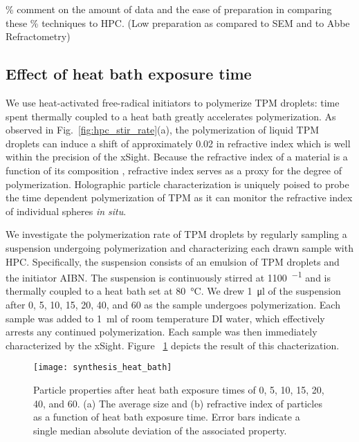 \% comment on the amount of data and the ease of preparation in comparing these
\% techniques to HPC. (Low preparation as compared to SEM and to Abbe Refractometry)

\subsection{Effect of heat bath exposure time}

We use heat-activated free-radical initiators to polymerize TPM droplets:
time spent thermally coupled to a heat bath greatly accelerates polymerization. 
As observed in Fig.~\ref{fig:hpc_stir_rate}(a), the polymerization of
liquid TPM droplets can induce a shift of approximately \SI{0.02}{} in refractive index
which is well within the precision of the xSight.  Because the refractive index
of a material is a function of its composition \cite{wang15},
refractive index serves as a proxy for the degree of polymerization.
Holographic particle characterization is uniquely poised to probe the time dependent
polymerization of TPM as it can monitor the refractive index of individual spheres
\emph{in situ}.

We investigate the polymerization rate of TPM droplets by regularly sampling a
suspension undergoing polymerization and characterizing each drawn sample with HPC.
Specifically, the suspension consists of an emulsion of TPM droplets
and the initiator AIBN. The suspension is continuously stirred at \SI{1100}{\min^{-1}}
and is thermally coupled to a heat bath set at \SI{80}{\degreeCelsius}.
We drew \SI{1}{\ul} of the suspension after \num{0}, \num{5}, \num{10}, \num{15},
\num{20}, \num{40}, and \SI{60}{\min} as the sample undergoes polymerization.
Each sample was added to \SI{1}{\ml} of room temperature DI water, which effectively
arrests any continued polymerization.
Each sample was then immediately characterized by the xSight. Figure ~\ref{fig:heat_size_time}
depicts the result of this chacterization.

\begin{figure}
    \centering
    \texttt{[image: synthesis\_heat\_bath]}
    \caption{Particle properties after heat bath exposure times of \num{0}, \num{5},
      \num{10}, \num{15}, \num{20}, \num{40}, and \SI{60}{\min}.
      (a) The average size and (b) refractive index of particles as a function
      of heat bath exposure time. Error bars indicate a single median absolute deviation
      of the associated property.}
    \label{fig:heat_size_time}
\end{figure}

